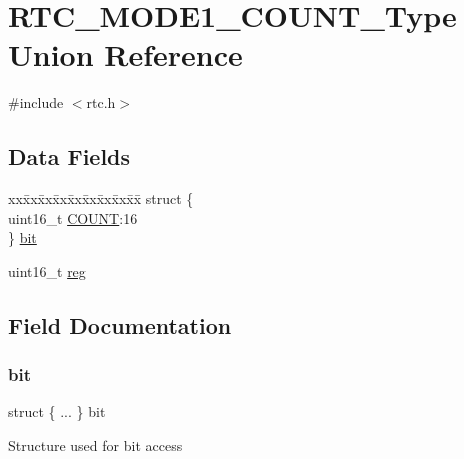 \hypertarget{union_r_t_c___m_o_d_e1___c_o_u_n_t___type}{}\section{R\+T\+C\+\_\+\+M\+O\+D\+E1\+\_\+\+C\+O\+U\+N\+T\+\_\+\+Type Union Reference}
\label{union_r_t_c___m_o_d_e1___c_o_u_n_t___type}


{\ttfamily \#include $<$rtc.\+h$>$}

\subsection*{Data Fields}
\begin{DoxyCompactItemize}
\item 
\begin{tabbing}
xx\=xx\=xx\=xx\=xx\=xx\=xx\=xx\=xx\=\kill
struct \{\\
\>uint16\_t \mbox{\hyperlink{union_r_t_c___m_o_d_e1___c_o_u_n_t___type_a58c1f45ba92b05a410866442e0351978}{COUNT}}:16\\
\} \mbox{\hyperlink{union_r_t_c___m_o_d_e1___c_o_u_n_t___type_a30cf1a8f227c1794bf5668e5e6526dea}{bit}}\\

\end{tabbing}\item 
uint16\+\_\+t \mbox{\hyperlink{union_r_t_c___m_o_d_e1___c_o_u_n_t___type_a11760f5020019f4aa8cb02e694f7cc44}{reg}}
\end{DoxyCompactItemize}


\subsection{Field Documentation}
\mbox{\label{union_r_t_c___m_o_d_e1___c_o_u_n_t___type_a30cf1a8f227c1794bf5668e5e6526dea}} 
\subsubsection{\texorpdfstring{bit}{bit}}
{\footnotesize\ttfamily struct \{ ... \}   bit}

Structure used for bit access \mbox{\label{union_r_t_c___m_o_d_e1___c_o_u_n_t___type_a58c1f45ba92b05a410866442e0351978}} 
